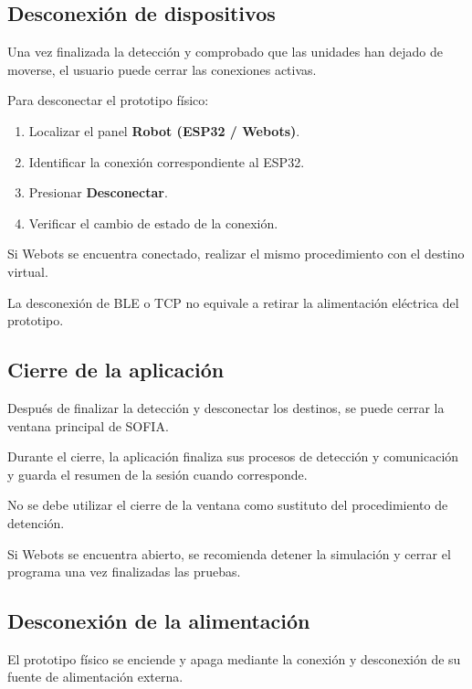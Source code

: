 \documentclass[letterpaper,journal]{IEEEtran}
\begin{document}
\subsection{Desconexión de dispositivos}

Una vez finalizada la detección
y comprobado que las unidades
han dejado de moverse, el usuario
puede cerrar las conexiones activas.

Para desconectar el prototipo físico:

\begin{enumerate}
    \item Localizar el panel
    \textbf{Robot (ESP32 / Webots)}.

    \item Identificar la conexión
    correspondiente al ESP32.

    \item Presionar
    \textbf{Desconectar}.

    \item Verificar el cambio
    de estado de la conexión.
\end{enumerate}

Si Webots se encuentra conectado,
realizar el mismo procedimiento
con el destino virtual.

La desconexión de BLE o TCP
no equivale a retirar la
alimentación eléctrica
del prototipo.

\subsection{Cierre de la aplicación}

Después de finalizar la detección
y desconectar los destinos,
se puede cerrar la ventana
principal de SOFIA.

Durante el cierre, la aplicación
finaliza sus procesos de
detección y comunicación
y guarda el resumen de
la sesión cuando corresponde.

No se debe utilizar el cierre
de la ventana como sustituto
del procedimiento de detención.

Si Webots se encuentra abierto,
se recomienda detener la simulación
y cerrar el programa una vez
finalizadas las pruebas.

\subsection{Desconexión de la alimentación}

El prototipo físico se enciende
y apaga mediante la conexión
y desconexión de su fuente
de alimentación externa.
\end{document}
